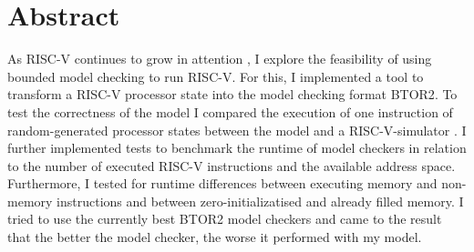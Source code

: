 \chapter*{Abstract}

As RISC-V continues to grow in attention \cite{eu}, I explore the
feasibility of using bounded model checking to run
RISC-V\cite{riscv-isa}. For this, I implemented a tool to transform a
RISC-V processor state into the model checking format
BTOR2\cite{btor2}. To test the correctness of the model I compared
the execution of one instruction of random-generated processor states
between the model and a RISC-V-simulator \cite{repoSim}. I further
implemented tests to benchmark the runtime of model checkers in
relation to the number of executed RISC-V instructions and the
available address space. Furthermore, I tested for runtime
differences between executing memory and non-memory instructions and
between zero-initializatised and already filled memory. I tried to
use the currently best BTOR2 model checkers \cite{HWMCC} and came to
the result that the better the model checker, the worse it performed
with my model.